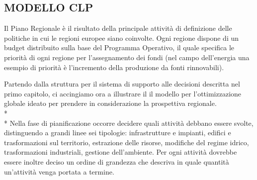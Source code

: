 \documentclass[12pt,a4paper,openright,twoside]{report}
\begin{document}
\subsection{MODELLO CLP}
Il Piano Regionale è il risultato della principale attività di definizione delle politiche in cui le regioni europee siano coinvolte. Ogni regione dispone di un budget distribuito sulla base del Programma Operativo, il quale specifica le priorità di ogni regione per l'assegnamento dei fondi (nel campo dell'energia una esempio di priorità è l'incremento della produzione da fonti rinnovabili).

Partendo dalla struttura per il sistema di supporto alle decisioni descritta nel primo capitolo, ci accingiamo ora a illustrare il il modello per l'ottimizzazione globale ideato per prendere in considerazione la prospettiva regionale. 
\\* \\*
Nella fase di pianificazione occorre decidere quali attività debbano essere svolte, distinguendo a grandi linee sei tipologie: infrastrutture e impianti, edifici e trasformazioni sul territorio, estrazione delle risorse, modifiche del regime idrico, trasformazioni industriali, gestione dell'ambiente. Per ogni attività dovrebbe essere inoltre deciso un ordine di grandezza che descriva in quale quantità un'attività venga portata a termine.
\end{document}
